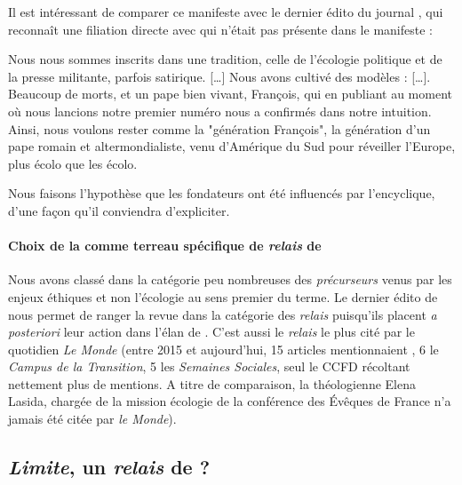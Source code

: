 Il est intéressant de comparer ce manifeste avec le dernier édito du journal \RLimite, qui reconnaît une filiation directe avec \LS qui n'était pas présente dans le manifeste :  
\begin{singlequote}
    Nous nous sommes inscrits dans une tradition, celle de l'écologie politique et de la presse militante, parfois satirique. [\ldots] Nous avons cultivé des modèles : [\ldots]. Beaucoup de morts, et un pape bien vivant, François, qui en publiant \LS au moment où nous lancions notre premier numéro nous a confirmés dans notre intuition. Ainsi, nous voulons rester comme la "génération François", la génération d'un pape romain et altermondialiste, venu d'Amérique du Sud pour réveiller l'Europe, plus écolo que les écolo.
\end{singlequote}
Nous faisons l'hypothèse que  les fondateurs \RLimite ont été influencés par l'encyclique, d'une façon qu'il conviendra d'expliciter. 

\begin{comment}
    Eviter le gloubi boulga; se donner un texte normatif par rapport aux crises, départ, critiques
\end{comment}



\paragraph{Choix de la \RLimite comme terreau spécifique de \textit{relais} de \LS} Nous avons classé \RLimite dans la catégorie peu nombreuses des \textit{précurseurs} venus par les enjeux éthiques et non l'écologie au sens premier du terme. Le dernier édito de \RLimite nous permet de ranger la revue dans la catégorie des \textit{relais} puisqu'ils placent \textit{a posteriori} leur action dans l'élan de \LS. C'est aussi le \textit{relais} le plus cité par le quotidien \textit{Le Monde} (entre 2015 et aujourd'hui, 15 articles mentionnaient \RLimite, 6 le \textit{Campus de la Transition}, 5 les \textit{Semaines Sociales}, seul le CCFD récoltant nettement plus de mentions. A titre de comparaison, la théologienne Elena Lasida, chargée de la mission écologie de la conférence des Évêques de France n'a jamais été citée  par \textit{le Monde}). 




\subsection{\textit{Limite}, un \textit{relais} de \LS ? }
